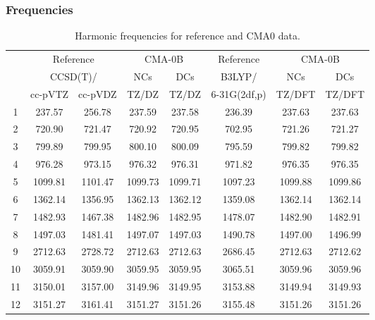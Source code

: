 \documentclass[10pt,oneside]{article}
\begin{document}
\subsubsection*{Frequencies}
\begin{table}[h!]
\centering
\caption{Harmonic frequencies for reference and CMA0 data.}
\begin{tabular}{cccccccc}
\toprule
{} & \multicolumn{2}{c}{Reference} & \multicolumn{2}{c}{CMA-0B} &    Reference & \multicolumn{2}{c}{CMA-0B} \\
{} & \multicolumn{2}{c}{CCSD(T)/} &     NCs &     DCs &       B3LYP/ &     NCs &     DCs \\
{} &   cc-pVTZ & cc-pVDZ &   TZ/DZ &   TZ/DZ & 6-31G(2df,p) &  TZ/DFT &  TZ/DFT \\
\midrule
1  &    237.57 &  256.78 &  237.59 &  237.58 &       236.39 &  237.63 &  237.63 \\
2  &    720.90 &  721.47 &  720.92 &  720.95 &       702.95 &  721.26 &  721.27 \\
3  &    799.89 &  799.95 &  800.10 &  800.09 &       795.59 &  799.82 &  799.82 \\
4  &    976.28 &  973.15 &  976.32 &  976.31 &       971.82 &  976.35 &  976.35 \\
5  &   1099.81 & 1101.47 & 1099.73 & 1099.71 &      1097.23 & 1099.88 & 1099.86 \\
6  &   1362.14 & 1356.95 & 1362.13 & 1362.12 &      1359.08 & 1362.14 & 1362.14 \\
7  &   1482.93 & 1467.38 & 1482.96 & 1482.95 &      1478.07 & 1482.90 & 1482.91 \\
8  &   1497.03 & 1481.41 & 1497.07 & 1497.03 &      1490.78 & 1497.00 & 1496.99 \\
9  &   2712.63 & 2728.72 & 2712.63 & 2712.63 &      2686.45 & 2712.63 & 2712.62 \\
10 &   3059.91 & 3059.90 & 3059.95 & 3059.95 &      3065.51 & 3059.96 & 3059.96 \\
11 &   3150.01 & 3157.00 & 3149.96 & 3149.95 &      3153.88 & 3149.94 & 3149.93 \\
12 &   3151.27 & 3161.41 & 3151.27 & 3151.26 &      3155.48 & 3151.26 & 3151.26 \\
\bottomrule
\end{tabular}
\end{table}

\clearpage
\end{document}
